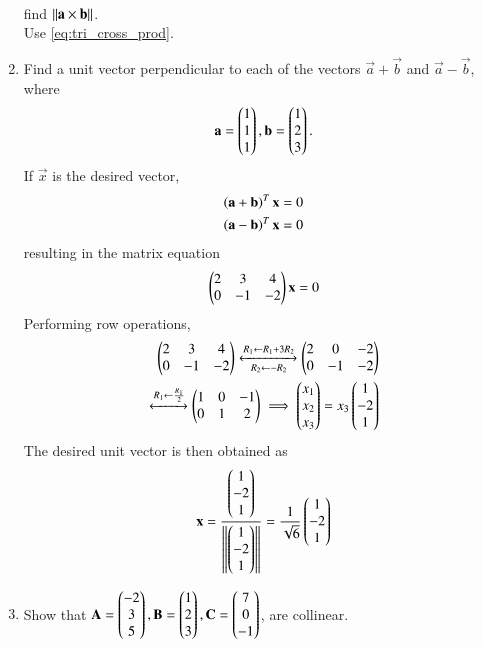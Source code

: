 \begin{enumerate}[label=\arabic*.,ref=\thesubsection.\theenumi]
\begin{align}
\end{align}
find $\left\lVert\mathbf{a} \times \mathbf{b}\right\rVert$.
%
\\
\solution Use \eqref{eq:tri_cross_prod}.
%
\item Find a unit vector perpendicular to each of the vectors
$\vec{a}+\vec{b}$ and $\vec{a}-\vec{b}$, where 
\begin{align}
\mathbf{a}=\begin{pmatrix}1\\1\\1\end{pmatrix},
\mathbf{b}=\begin{pmatrix}1\\2\\3\end{pmatrix}.
\end{align}
%
\solution If $\vec{x}$ is the desired vector, 
%
\begin{align}
\left(\mathbf{a}+\mathbf{b}\right)^T\mathbf{x}=0
\\
\left(\mathbf{a}-\mathbf{b}\right)^T\mathbf{x}=0
\end{align}
%
resulting in the matrix equation 
%
\begin{align}
\begin{pmatrix}2 & 3 & 4\\
0 & -1 & -2\end{pmatrix}\mathbf{x} = 0
\end{align}
%
Performing row operations, 
%
\begin{align}
\begin{pmatrix}2 & 3 & 4\\
0 & -1 & -2\end{pmatrix}
\xleftrightarrow[R_2 \leftarrow -R_2]{R_1\leftarrow R_1+3R_2}
\begin{pmatrix}
2 & 0 & -2\\
0 & -1 & -2
\end{pmatrix} 
\\
\xleftrightarrow{R_1\leftarrow \frac{R_1}{2}}
\begin{pmatrix}
1 & 0 & -1\\
0 & 1 & 2
\end{pmatrix} 
\implies \begin{pmatrix}x_1\\x_2\\x_3\end{pmatrix} = x_3\begin{pmatrix}1\\-2\\1\end{pmatrix}
\end{align}
%
The desired unit vector is then obtained as
%
\begin{align}
\mathbf{x} =\frac{\begin{pmatrix}1\\-2\\1\end{pmatrix}}{\left\lVert\begin{pmatrix}1\\-2\\1\end{pmatrix}\right\rVert}
=\frac{1}{\sqrt{6}}\begin{pmatrix}1\\-2\\1\end{pmatrix}
\end{align}
\item Show that 
$\mathbf{A}=\begin{pmatrix}-2\\3\\5\end{pmatrix}, \mathbf{B}=\begin{pmatrix}1\\2\\3\end{pmatrix}, \mathbf{C}=\begin{pmatrix}7\\0\\-1\end{pmatrix}$, are collinear.

\end{enumerate}
